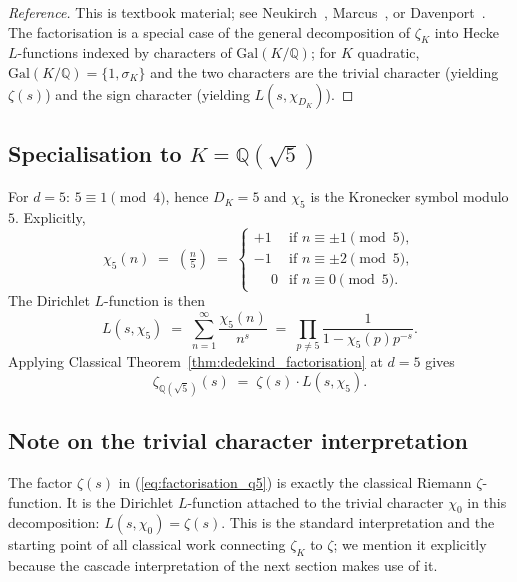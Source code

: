 \documentclass[11pt,a4paper]{article}
\theoremstyle{definition}
\theoremstyle{remark}
\begin{document}
\begin{proof}[Reference]
This is textbook material; see Neukirch~\cite[Ch.~VII, \S5]{Neukirch1999},
Marcus~\cite[Ch.~7]{Marcus1977}, or
Davenport~\cite[Ch.~5]{Davenport2000}. The factorisation is a special
case of the general decomposition of $\zeta_K$ into Hecke $L$-functions
indexed by characters of $\mathrm{Gal}(K/\mathbb{Q})$; for $K$ quadratic,
$\mathrm{Gal}(K/\mathbb{Q}) = \{1, \sigma_K\}$ and the two characters are
the trivial character (yielding $\zeta(s)$) and the sign character
(yielding $L(s, \chi_{D_K})$).
\end{proof}

\subsection{Specialisation to $K = \mathbb{Q}(\sqrt{5})$}

For $d = 5$: $5 \equiv 1 \pmod 4$, hence $D_K = 5$ and $\chi_5$ is the
Kronecker symbol modulo $5$. Explicitly,
\[
  \chi_5(n) \;=\; \left(\tfrac{n}{5}\right)
  \;=\;
  \begin{cases}
    +1 & \text{if } n \equiv \pm 1 \pmod{5},\\
    -1 & \text{if } n \equiv \pm 2 \pmod{5},\\
    \phantom{+}0 & \text{if } n \equiv 0 \pmod{5}.
  \end{cases}
\]
The Dirichlet $L$-function is then
\[
  L(s, \chi_5) \;=\; \sum_{n=1}^{\infty} \frac{\chi_5(n)}{n^s}
    \;=\; \prod_{p \neq 5} \frac{1}{1 - \chi_5(p) p^{-s}}.
\]
Applying Classical Theorem~\ref{thm:dedekind_factorisation} at $d = 5$
gives
\begin{equation}\label{eq:factorisation_q5}
  \zeta_{\mathbb{Q}(\sqrt{5})}(s) \;=\; \zeta(s) \cdot L(s, \chi_5).
\end{equation}

\subsection{Note on the trivial character interpretation}

The factor $\zeta(s)$ in (\ref{eq:factorisation_q5}) is exactly the
classical Riemann $\zeta$-function. It is the Dirichlet $L$-function
attached to the trivial character $\chi_0$ in this decomposition:
$L(s, \chi_0) = \zeta(s)$. This is the standard interpretation and the
starting point of all classical work connecting $\zeta_K$ to $\zeta$;
we mention it explicitly because the cascade interpretation of the next
section makes use of it.
\end{document}
